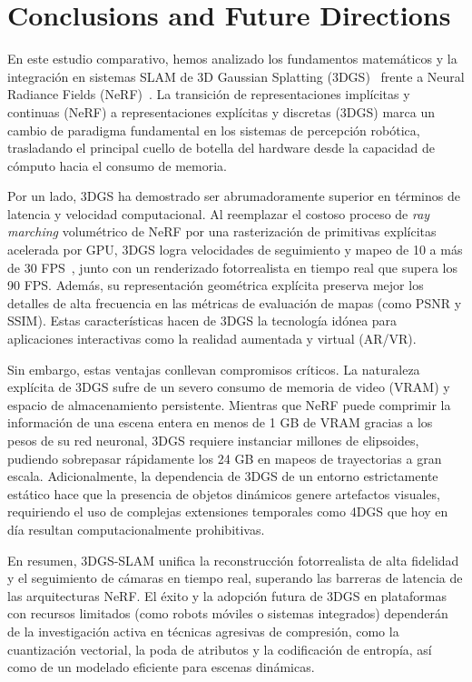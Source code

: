 \section{Conclusions and Future Directions}
\label{sec:conclusion}

En este estudio comparativo, hemos analizado los fundamentos matemáticos y la integración en sistemas SLAM de 
3D Gaussian Splatting (3DGS)~\cite{kerbl20233d} frente a Neural Radiance Fields (NeRF)~\cite{mildenhall2020nerf}. 
La transición de representaciones implícitas y continuas (NeRF) a representaciones explícitas y discretas (3DGS) 
marca un cambio de paradigma fundamental en los sistemas de percepción robótica, 
trasladando el principal cuello de botella del hardware desde la capacidad de cómputo hacia el consumo de memoria.

Por un lado, 3DGS ha demostrado ser abrumadoramente superior en términos de latencia y velocidad computacional. 
Al reemplazar el costoso proceso de \textit{ray marching} volumétrico de NeRF por una rasterización de primitivas 
explícitas acelerada por GPU, 3DGS logra velocidades de seguimiento y mapeo de 10 a más de 30 
FPS~\cite{keetha2024splatam}, junto con un renderizado fotorrealista en tiempo real que supera los 90 FPS. 
Además, su representación geométrica explícita preserva mejor los detalles de alta frecuencia en las métricas 
de evaluación de mapas (como PSNR y SSIM). Estas características hacen de 3DGS la tecnología idónea para 
aplicaciones interactivas como la realidad aumentada y virtual (AR/VR).

Sin embargo, estas ventajas conllevan compromisos críticos. La naturaleza explícita de 3DGS sufre de un severo 
consumo de memoria de video (VRAM) y espacio de almacenamiento persistente. Mientras que NeRF puede comprimir la
 información de una escena entera en menos de 1 GB de VRAM gracias a los pesos de su red neuronal, 
 3DGS requiere instanciar millones de elipsoides, pudiendo sobrepasar rápidamente los 24 GB en mapeos de 
 trayectorias a gran escala. Adicionalmente, la dependencia de 3DGS de un entorno estrictamente estático hace 
 que la presencia de objetos dinámicos genere artefactos visuales, requiriendo el uso de complejas extensiones 
 temporales como 4DGS que hoy en día resultan computacionalmente prohibitivas.

En resumen, 3DGS-SLAM unifica la reconstrucción fotorrealista de alta fidelidad y el seguimiento de cámaras en 
tiempo real, superando las barreras de latencia de las arquitecturas NeRF. El éxito y la adopción futura de 3DGS 
en plataformas con recursos limitados (como robots móviles o sistemas integrados) dependerán de la investigación 
activa en técnicas agresivas de compresión, como la cuantización vectorial, la poda de atributos y la codificación
de entropía, así como de un modelado eficiente para escenas dinámicas.